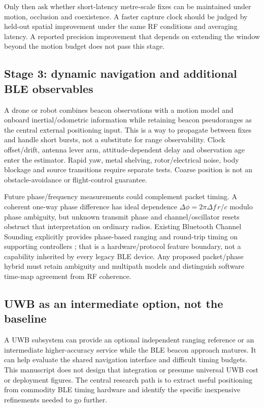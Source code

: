 \documentclass[11pt,letterpaper]{article}
\begin{document}
Only then ask whether short-latency metre-scale fixes can be maintained under motion, occlusion and coexistence. A faster capture clock should be judged by held-out spatial improvement under the same RF conditions and averaging latency. A reported precision improvement that depends on extending the window beyond the motion budget does not pass this stage.

\subsection{Stage 3: dynamic navigation and additional BLE observables}
A drone or robot combines beacon observations with a motion model and onboard inertial/odometric information while retaining beacon pseudoranges as the central external positioning input. This is a way to propagate between fixes and handle short bursts, not a substitute for range observability. Clock offset/drift, antenna lever arm, attitude-dependent delay and observation age enter the estimator. Rapid yaw, metal shelving, rotor/electrical noise, body blockage and source transitions require separate tests. Coarse position is not an obstacle-avoidance or flight-control guarantee.

Future phase/frequency measurements could complement packet timing. A coherent one-way phase difference has ideal dependence $\Delta\phi=2\pi\Delta f\,r/c$ modulo phase ambiguity, but unknown transmit phase and channel/oscillator resets obstruct that interpretation on ordinary radios. Existing Bluetooth Channel Sounding explicitly provides phase-based ranging and round-trip timing on supporting controllers \cite{channelsounding}; that is a hardware/protocol feature boundary, not a capability inherited by every legacy BLE device. Any proposed packet/phase hybrid must retain ambiguity and multipath models and distinguish software time-map agreement from RF coherence.

\subsection{UWB as an intermediate option, not the baseline}
A UWB subsystem can provide an optional independent ranging reference or an intermediate higher-accuracy service while the BLE beacon approach matures. It can help evaluate the shared navigation interface and difficult timing budgets. This manuscript does not design that integration or presume universal UWB cost or deployment figures. The central research path is to extract useful positioning from commodity BLE timing hardware and identify the specific inexpensive refinements needed to go further.
\end{document}
